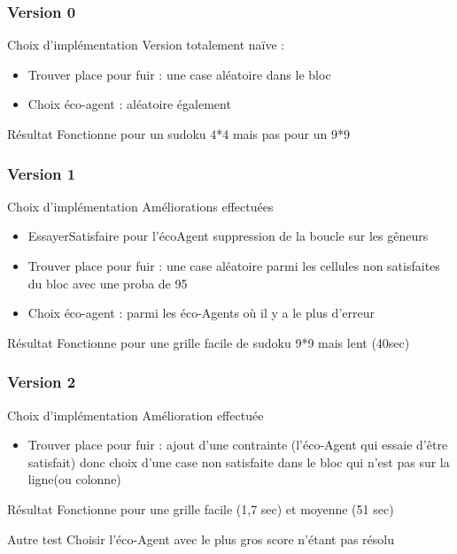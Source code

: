 \begin{frame}
    \frametitle{Version 0}
    \begin{block}{Choix d'implémentation}
    		Version totalement naïve :
    		\begin{itemize}
    			\item Trouver place pour fuir : une case aléatoire dans le bloc
    			\item Choix éco-agent : aléatoire également
    		\end{itemize}
    \end{block}
    \pause
    \begin{alertblock}{Résultat}
    		Fonctionne pour un sudoku 4*4 mais pas pour un 9*9
    \end{alertblock}
\end{frame}


\begin{frame}
    \frametitle{Version 1}
    \begin{block}{Choix d'implémentation}
    		Améliorations effectuées
    		\begin{itemize}
    			\item EssayerSatisfaire pour l'écoAgent suppression de la boucle sur les gêneurs
    			\item Trouver place pour fuir : une case aléatoire parmi les cellules non satisfaites du bloc avec une proba de 95%
    			\item Choix éco-agent : parmi les éco-Agents où il y a le plus d'erreur 
    		\end{itemize}
    \end{block}
    \pause
    \begin{alertblock}{Résultat}
    		Fonctionne pour une grille facile de sudoku 9*9 mais lent (40sec)
    \end{alertblock}
\end{frame}

\begin{frame}
    \frametitle{Version 2}
    \begin{block}{Choix d'implémentation}
    		Amélioration effectuée
    		\begin{itemize}
    			\item Trouver place pour fuir : ajout d'une contrainte (l'éco-Agent qui essaie d'être satisfait) donc choix d'une case non satisfaite dans le bloc qui n'est pas sur la ligne(ou colonne)
    		\end{itemize}
    \end{block}
    \pause
    \begin{alertblock}{Résultat}
    		Fonctionne pour une grille facile (1,7 sec) et moyenne (51 sec)
    \end{alertblock}
    \pause
    \begin{exampleblock}{Autre test}
		Choisir l'éco-Agent avec le plus gros score n'étant pas résolu
	\end{exampleblock}
\end{frame}


